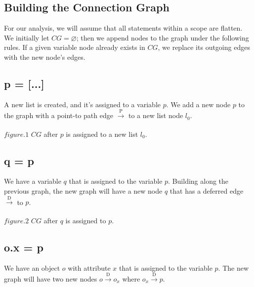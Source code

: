 \documentclass[11pt,article]{amsart}
\theoremstyle{definition}
\numberwithin{equation}{subsection}
\begin{document}
\begin{multicols}{2}
\section{Building the Connection Graph}
For our analysis, we will assume that all statements within a scope are flatten. We initially let $CG = \varnothing$; then we append nodes to the graph under the following rules. If a given variable node already exists in $CG$, we replace its outgoing edges with the new node's edges. 
\subsection{p = [...]}
A new list is created, and it's assigned to a variable $p$. We add a new node $p$ to the graph with a point-to path edge $\xrightarrow[]{\text{P}}$ to a new list node $l_0$. 


$figure.1$ $CG$ after $p$ is assigned to a new list $l_0$.

\subsection{q = p}
We have a variable $q$ that is assigned to the variable $p$. Building along the previous graph, the new graph will have a new node $q$ that has a deferred edge $\xrightarrow[]{\text{D}}$  to $p$.  


$figure.2$ $CG$ after $q$ is assigned to $p$.

\subsection{o.x = p}
We have an object $o$ with attribute $x$ that is assigned to the variable $p$. The new graph will have two new nodes $o \xrightarrow[]{\text{D}} o_x$ where $o_x \xrightarrow[]{\text{D}} p$.  


\end{multicols}
\end{document}
